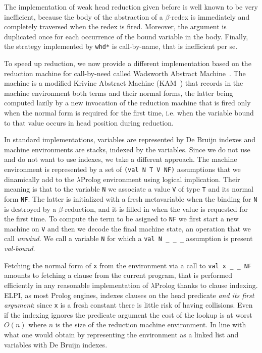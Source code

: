 The implementation of weak head reduction given before is well known to be very inefficient, because the body of the abstraction of a $\beta$-redex is immediately and completely traversed when the redex is fired. Moreover, the argument is duplicated once for each occurrence of the bound variable in the body. Finally, the strategy implemented by \verb+whd*+ is call-by-name, that is inefficient per se.

To speed up reduction, we now provide a different implementation based on the reduction machine for call-by-need called Wadsworth Abstract Machine~\cite{beniamino}. The machine is a modified Krivine Abstract Machine (KAM~\cite{kam}) that records in the machine environment both terms and their normal forms, the latter being computed lazily by a new invocation of the reduction machine that is fired only when the normal form is required for the first time, i.e. when the variable bound to that value occurs in head position during reduction.

In standard implementations, variables are represented by De Bruijn indexes and machine environments are stacks, indexed by the variables. Since we do not use and do not want to use indexes, we take a different approach. The machine environment is represented by a set of \verb+(val N T V NF)+ assumptions that we dinamically add to the $\lambda$Prolog environment using logical implication. Their meaning is that to the variable \verb+N+ we associate a value \verb+V+ of type \verb+T+ and its normal form \verb+NF+. The latter is initialized with a fresh metavariable when the binding for \verb+N+ is destroyed by a $\beta$-reduction, and it is filled in when the value is requested for the first time. To compute the term to be asigned to \verb+NF+ we first start a new machine on \verb+V+ and then we decode the final machine state, an operation that we call \emph{unwind}.  We call a variable \verb+N+ for which a \verb+val N _ _ _+ assumption is present \emph{val-bound}.

Fetching the normal form of \verb+x+ from the environment via a call to \verb+val x _ _ NF+ amounts to fetching a clause from the current program, that is performed efficiently in any reasonable implementation of $\lambda$Prolog thanks to clause indexing.  ELPI, as most Prolog engines, indexes clauses on the head predicate \emph{and its first argument}: since \verb+x+ is a fresh constant there is little risk of having collisions.  Even if the indexing ignores the predicate argument the cost of the lookup is at worst $O(n)$ where $n$ is the size of the reduction machine environment.  In line with what one would obtain by representing the environment as a linked list and variables with De Bruijn indexes.

